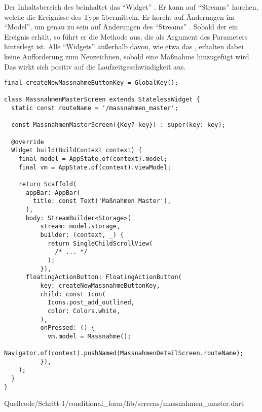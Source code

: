 Der Inhaltsbereich des  beinhaltet das \enquote{Widget}  .
Er kann auf \enquote{Streams} horchen, welche die Ereignisse des Typs  übermitteln.
Er horcht auf Änderungen im \enquote{Model}, um genau zu sein auf Änderungen des \enquote{Streams}  .
Sobald der  ein Ereignis erhält, so führt er die Methode aus, die als Argument des Parameters  hinterlegt ist.
Alle \enquote{Widgets} außerhalb davon, wie etwa das , erhalten dabei keine Aufforderung zum Neuzeichnen, sobald eine Maßnahme hinzugefügt wird.
Das wirkt sich positiv auf die Laufzeitgeschwindigkeit aus.


\ifIncludeFigures
  \begin{listing}[htbp]
    \let\oldtheFancyVerbLine\theFancyVerbLine
    \renewcommand\theFancyVerbLine{%
      \ifnum\value{FancyVerbLine}=31
      \setcounter{FancyVerbLine}{85}
      \else
      \oldtheFancyVerbLine%
      \fi
    }
    \begin{verbatim}
final createNewMassnahmeButtonKey = GlobalKey();

class MassnahmenMasterScreen extends StatelessWidget {
  static const routeName = '/massnahmen_master';

  const MassnahmenMasterScreen({Key? key}) : super(key: key);

  @override
  Widget build(BuildContext context) {
    final model = AppState.of(context).model;
    final vm = AppState.of(context).viewModel;

    return Scaffold(
      appBar: AppBar(
        title: const Text('Maßnahmen Master'),
      ),
      body: StreamBuilder<Storage>(
          stream: model.storage,
          builder: (context, _) {
            return SingleChildScrollView(
              /* ... */
            );
          }),
      floatingActionButton: FloatingActionButton(
          key: createNewMassnahmeButtonKey,
          child: const Icon(
            Icons.post_add_outlined,
            color: Colors.white,
          ),
          onPressed: () {
            vm.model = Massnahme();
            Navigator.of(context).pushNamed(MassnahmenDetailScreen.routeName);
          }),
    );
  }
}
\end{verbatim}
     {Quellcode/Schritt-1/conditional_form/lib/screens/massnahmen_master.dart}
    \label{lst:Schritt1KlasseMassnahmenMasterScreenStruktur}
  \end{listing}
\fi

